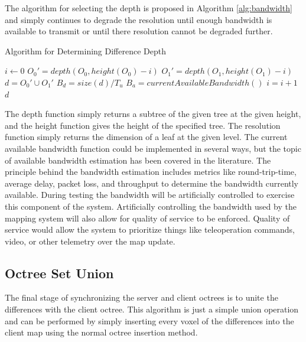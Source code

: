 \documentclass[12pt]{report}
\begin{document}
The algorithm for selecting the depth is proposed in Algorithm \ref{alg:bandwidth} and simply continues to degrade the resolution until enough bandwidth is available to transmit or until there resolution cannot be degraded further.

\begin{algorithm}
\caption{Algorithm for Determining Difference Depth}
\label{alg:bandwidth}
\begin{algorithmic}
  \STATE {}
  \STATE {}
  \STATE {}
  \STATE {}
  \STATE {}
  \STATE {}
  \STATE {}
  \STATE $i\gets 0$
  \REPEAT
    \STATE $O_0 \prime = depth(O_0,height(O_0)-i)$
    \STATE $O_1 \prime = depth(O_1,height(O_1)-i)$
    \STATE $d = O_0 \prime \cup O_1 \prime $
    \STATE $B_d = size(d) / T_u$
    \STATE $B_a = currentAvailableBandwidth()$
    \STATE $i = i + 1$
  \RETURN $d$
\end{algorithmic}
\end{algorithm}

The depth function simply returns a subtree of the given tree at the given height, and the height function gives the height of the specified tree.  The resolution function simply returns the dimension of a leaf at the given level.  The current available bandwidth function could be implemented in several ways, but the topic of available bandwidth estimation has been covered in the literature\cite{prasad2003bandwidth}. The principle behind the bandwidth estimation includes metrics like round-trip-time, average delay, packet loss, and throughput to determine the bandwidth currently available.  During testing the bandwidth will be artificially controlled to exercise this component of the system.  Artificially controlling the bandwidth used by the mapping system will also allow for quality of service to be enforced.  Quality of service would allow the system to prioritize things like teleoperation commands, video, or other telemetry over the map update.

\subsection{Octree Set Union}
The final stage of synchronizing the server and client octrees is to unite the differences with the client octree. This algorithm is just a simple union operation and can be performed by simply inserting every voxel of the differences into the client map using the normal octree insertion method.\cite{meagher1982geometric}
\end{document}
